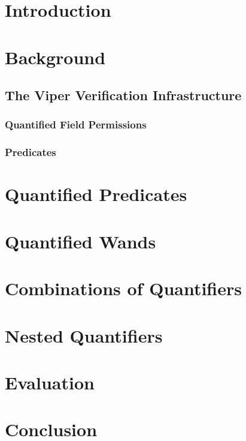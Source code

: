 \documentclass[12pt]{article}
\begin{document}
\maketitle

\section{Introduction}
\section{Background}
\subsection{The Viper Verification Infrastructure}
\subsubsection{Quantified Field Permissions}
\subsubsection{Predicates}
\section{Quantified Predicates}
\section{Quantified Wands}
\section{Combinations of Quantifiers}
\section{Nested Quantifiers}
\section{Evaluation}
\section{Conclusion}

\end{document}
